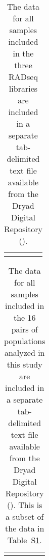 \begin{table}[htbp]
\sffamily
\captionsetup{name=Table S, labelformat=noSpace}
\caption{
    The data for all samples included in the three RADseq libraries are
    included in a separate tab-delimited text file
    available from the Dryad Digital Repository
    ().
}
\centering
\begin{tabular}{ l l }
     &  \\
\end{tabular}
\label{table:reftosampledata}
\end{table}

\begin{table}[htbp]
\sffamily
\captionsetup{name=Table S, labelformat=noSpace}
\caption{
    The data for all samples included in the 16 pairs of populations analyzed
    in this study are included in a separate tab-delimited text file
    available from the Dryad Digital Repository
    ().
    This is a subset of the data in Table~S\ref{table:reftosampledata}.
}
\centering
\begin{tabular}{ l l }
     &  \\
\end{tabular}
\label{table:reftopairsampledata}
\end{table}





